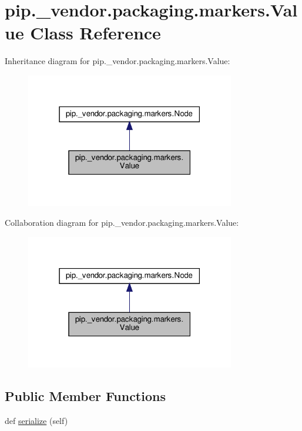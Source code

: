 \hypertarget{classpip_1_1__vendor_1_1packaging_1_1markers_1_1Value}{}\section{pip.\+\_\+vendor.\+packaging.\+markers.\+Value Class Reference}
\label{classpip_1_1__vendor_1_1packaging_1_1markers_1_1Value}


Inheritance diagram for pip.\+\_\+vendor.\+packaging.\+markers.\+Value\+:
\nopagebreak
\begin{figure}[H]
\begin{center}
\leavevmode
\includegraphics[width=259pt]{classpip_1_1__vendor_1_1packaging_1_1markers_1_1Value__inherit__graph}
\end{center}
\end{figure}


Collaboration diagram for pip.\+\_\+vendor.\+packaging.\+markers.\+Value\+:
\nopagebreak
\begin{figure}[H]
\begin{center}
\leavevmode
\includegraphics[width=259pt]{classpip_1_1__vendor_1_1packaging_1_1markers_1_1Value__coll__graph}
\end{center}
\end{figure}
\subsection*{Public Member Functions}
\begin{DoxyCompactItemize}
\item 
def \hyperlink{classpip_1_1__vendor_1_1packaging_1_1markers_1_1Value_a8e09024b9ea4e55ecbb653c9d77a750b}{serialize} (self)
\end{DoxyCompactItemize}
